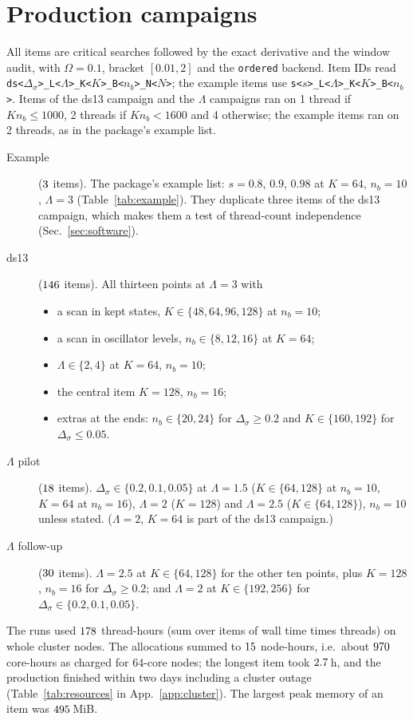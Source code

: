 \documentclass[10pt,a4paper]{article}
\newcommand{\Ds}{\Delta_\sigma}
\newcommand{\code}[1]{\texttt{#1}}
\begin{document}
\section{Production campaigns}\label{sec:campaigns}
All items are critical searches followed by the exact derivative and the window audit, with $\Omega=0.1$, bracket $[0.01,2]$ and
the \code{ordered} backend. Item IDs read \code{ds<$\Ds$>\_L<$\Lambda$>\_K<$K$>\_B<$n_b$>\_N<$N$>}; the example items use
\code{s<$s$>\_L<$\Lambda$>\_K<$K$>\_B<$n_b$>}. Items of the ds13 campaign and the $\Lambda$ campaigns ran on 1 thread if
$Kn_b\le1000$, 2 threads if $Kn_b<1600$ and 4 otherwise; the example items ran on 2 threads, as in the package's example list.
\begin{description}
\item[Example] ($3$ items). The package's example list: $s=0.8$, $0.9$, $0.98$ at $K=64$, $n_b=10$, $\Lambda=3$
  (Table~\ref{tab:example}). They duplicate three items of the ds13 campaign, which makes them a test of thread-count
  independence (Sec.~\ref{sec:software}).
\item[ds13] ($146$ items). All thirteen points at $\Lambda=3$ with
  \begin{itemize}
  \item a scan in kept states, $K\in\{48,64,96,128\}$ at $n_b=10$;
  \item a scan in oscillator levels, $n_b\in\{8,12,16\}$ at $K=64$;
  \item $\Lambda\in\{2,4\}$ at $K=64$, $n_b=10$;
  \item the central item $K=128$, $n_b=16$;
  \item extras at the ends: $n_b\in\{20,24\}$ for $\Ds\ge0.2$ and $K\in\{160,192\}$ for $\Ds\le0.05$.
  \end{itemize}
\item[$\Lambda$ pilot] ($18$ items). $\Ds\in\{0.2,0.1,0.05\}$ at $\Lambda=1.5$ ($K\in\{64,128\}$ at $n_b=10$, $K=64$ at
  $n_b=16$), $\Lambda=2$ ($K=128$) and $\Lambda=2.5$ ($K\in\{64,128\}$), $n_b=10$ unless stated. ($\Lambda=2$, $K=64$ is part of the
  ds13 campaign.)
\item[$\Lambda$ follow-up] ($30$ items). $\Lambda=2.5$ at $K\in\{64,128\}$ for the other ten points, plus $K=128$,
  $n_b=16$ for $\Ds\ge0.2$; and $\Lambda=2$ at $K\in\{192,256\}$ for $\Ds\in\{0.2,0.1,0.05\}$.
\end{description}
The runs used $178$ thread-hours (sum over items of wall time times threads) on whole cluster nodes. The allocations
summed to $15$ node-hours, i.e.\ about $970$ core-hours as charged for 64-core nodes; the longest item
took $2.7$\,h, and the production finished within two days including a cluster outage (Table~\ref{tab:resources} in
App.~\ref{app:cluster}). The largest peak memory of an item was $495$\,MiB.
\end{document}

